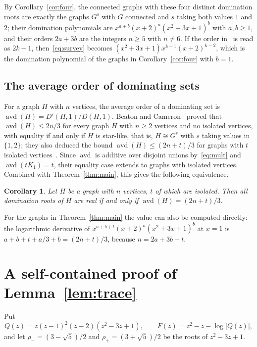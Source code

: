 \documentclass{amsart}
\newtheorem{corollary}[theorem]{Corollary}
\theoremstyle{definition}
\theoremstyle{remark}
\numberwithin{equation}{section}
\newcommand{\rhom}{\rho_-}
\newcommand{\rhop}{\rho_+}
\begin{document}
By Corollary~\ref{cor:four}, the connected graphs with these four distinct domination roots are exactly the graphs $G^s$ with $G$ connected and $s$ taking both values $1$ and $2$; their domination polynomials are $x^{a+b}(x+2)^a(x^2+3x+1)^b$ with $a,b\ge1$, and their orders $2a+3b$ are the integers $n\ge5$ with $n\ne6$. If the order in~\cite[Theorem~10]{Ali11s} is read as $2k-1$, then~\eqref{eq:survey} becomes $(x^2+3x+1)x^{k-1}(x+2)^{k-2}$, which is the domination polynomial of the graphs in Corollary~\ref{cor:four} with $b=1$.

\subsection{The average order of dominating sets}

For a graph $H$ with $n$ vertices, the average order of a dominating set is $\operatorname{avd}(H)=D'(H,1)/D(H,1)$. Beaton and Cameron~\cite[Theorem~2.10]{BC24} proved that $\operatorname{avd}(H)\le 2n/3$ for every graph $H$ with $n\ge2$ vertices and no isolated vertices, with equality if and only if $H$ is star-like, that is, $H\cong G^s$ with $s$ taking values in $\{1,2\}$; they also deduced the bound $\operatorname{avd}(H)\le(2n+t)/3$ for graphs with $t$ isolated vertices~\cite[Corollary~2.11]{BC24}. Since $\operatorname{avd}$ is additive over disjoint unions by~\eqref{eq:mult} and $\operatorname{avd}(tK_1)=t$, their equality case extends to graphs with isolated vertices. Combined with Theorem~\ref{thm:main}, this gives the following equivalence.

\begin{corollary}\label{cor:avd}
Let $H$ be a graph with $n$ vertices, $t$ of which are isolated. Then all domination roots of $H$ are real if and only if $\operatorname{avd}(H)=(2n+t)/3$.
\end{corollary}

For the graphs in Theorem~\ref{thm:main} the value can also be computed directly: the logarithmic derivative of $x^{a+b+t}(x+2)^a(x^2+3x+1)^b$ at $x=1$ is $a+b+t+a/3+b=(2n+t)/3$, because $n=2a+3b+t$.

\appendix

\section{A self-contained proof of Lemma~\ref{lem:trace}}\label{app:trace}

Put
\[
Q(z)=z(z-1)^2(z-2)(z^2-3z+1),\qquad F(z)=z^2-z-\log|Q(z)|,
\]
and let $\rhom=(3-\sqrt5)/2$ and $\rhop=(3+\sqrt5)/2$ be the roots of $z^2-3z+1$.
\end{document}
